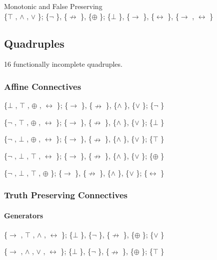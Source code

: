 Monotonic and False Preserving\\
\{$\top$ , $\land$ , $\lor$ \}; \{$\neg$ \}, \{$\nrightarrow$ \}, \{$\oplus$ \}; \{$\bot$ \}, \{$\to$ \}, \{$\leftrightarrow$ \}, \{$\to$ , $\leftrightarrow$ \}

\hypertarget{quadruples}{%
\subsection{Quadruples}\label{quadruples}}

16 functionally incomplete quadruples.

\hypertarget{affine-connectives-1}{%
\subsubsection{Affine Connectives}\label{affine-connectives-1}}

\{$\bot$ , $\top$ , $\oplus$ , $\leftrightarrow$ \}; \{$\to$ \}, \{$\nrightarrow$ \}, \{$\land$ \}, \{$\lor$ \}; \{$\neg$ \}

\{$\neg$ , $\top$ , $\oplus$ , $\leftrightarrow$ \}; \{$\to$ \}, \{$\nrightarrow$ \}, \{$\land$ \}, \{$\lor$ \}; \{$\bot$ \}

\{$\neg$ , $\bot$ , $\oplus$ , $\leftrightarrow$ \}; \{$\to$ \}, \{$\nrightarrow$ \}, \{$\land$ \}, \{$\lor$ \}; \{$\top$ \}

\{$\neg$ , $\bot$ , $\top$ , $\leftrightarrow$ \}; \{$\to$ \}, \{$\nrightarrow$ \}, \{$\land$ \}, \{$\lor$ \}; \{$\oplus$ \}

\{$\neg$ , $\bot$ , $\top$ , $\oplus$ \}; \{$\to$ \}, \{$\nrightarrow$ \}, \{$\land$ \}, \{$\lor$ \}; \{$\leftrightarrow$ \}

\hypertarget{truth-preserving-connectives-1}{%
\subsubsection{Truth Preserving
Connectives}\label{truth-preserving-connectives-1}}

\hypertarget{generators-3}{%
\paragraph{Generators}\label{generators-3}}

\{$\to$ , $\top$ , $\land$ , $\leftrightarrow$ \}; \{$\bot$ \}, \{$\neg$ \}, \{$\nrightarrow$ \}, \{$\oplus$ \}; \{$\lor$ \}

\{$\to$ , $\land$ , $\lor$ , $\leftrightarrow$ \}; \{$\bot$ \}, \{$\neg$ \}, \{$\nrightarrow$ \}, \{$\oplus$ \}; \{$\top$ \}

